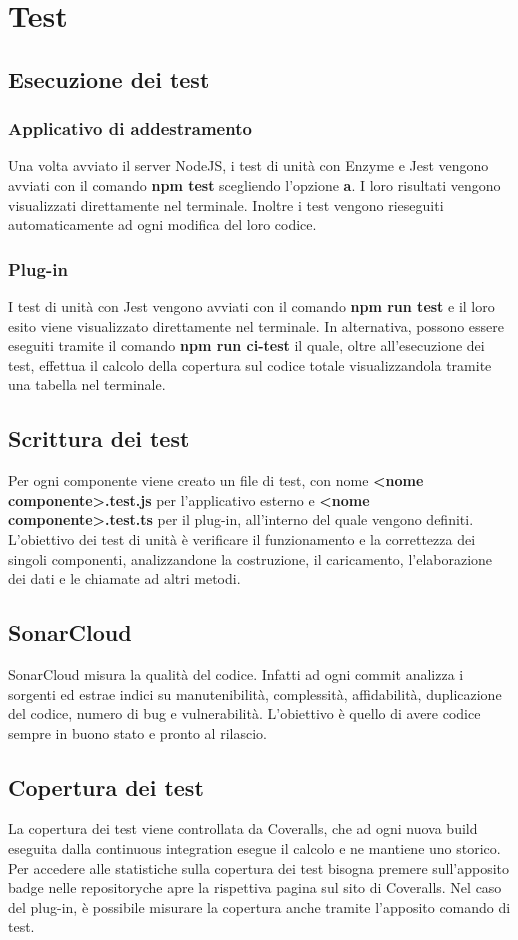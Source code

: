 \section{Test}
	\subsection{Esecuzione dei test}
		\subsubsection{Applicativo di addestramento}
			Una volta avviato il server NodeJS, i test di unità con Enzyme e Jest vengono avviati con il comando \textbf{npm test} scegliendo l'opzione \textbf{a}. I loro risultati vengono visualizzati direttamente nel terminale. Inoltre i test vengono rieseguiti automaticamente ad ogni modifica del loro codice.
		\subsubsection{Plug-in}
			I test di unità con Jest vengono avviati con il comando \textbf{npm run test} e il loro esito viene visualizzato direttamente nel terminale. In alternativa, possono essere eseguiti tramite il comando \textbf{npm run ci-test} il quale, oltre all'esecuzione dei test, effettua il calcolo della copertura sul codice totale visualizzandola tramite una tabella nel terminale.
	\subsection{Scrittura dei test}
		Per ogni componente viene creato un file di test, con nome \textbf{<nome componente>.test.js} per l'applicativo esterno e \textbf{<nome componente>.test.ts} per il plug-in, all'interno del quale vengono definiti. L'obiettivo dei test di unità è verificare il funzionamento e la correttezza dei singoli componenti, 
		analizzandone la costruzione, il caricamento, l'elaborazione dei dati e le chiamate ad altri metodi.
	\subsection{SonarCloud}
		SonarCloud misura la qualità del codice. Infatti ad ogni commit analizza i sorgenti ed estrae indici su manutenibilità, complessità, affidabilità, duplicazione del codice, numero di bug e vulnerabilità. L'obiettivo è quello di avere codice sempre in buono stato e pronto al rilascio.
	\subsection{Copertura dei test}
		La copertura dei test viene controllata da Coveralls, che ad ogni nuova build eseguita dalla continuous integration esegue il calcolo e ne mantiene uno storico. Per accedere alle statistiche sulla copertura dei test bisogna premere sull'apposito badge nelle repository\glosp che apre la rispettiva pagina sul sito di Coveralls. Nel caso del plug-in, è possibile misurare la copertura anche tramite l'apposito comando di test.
